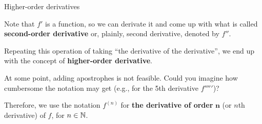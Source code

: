 \documentclass[9pt]{beamer}
\begin{document}
\begin{frame}{Higher-order derivatives}

    Note that $f'$ is a  function, so we can derivate it and come up with what is called \textbf{second-order derivative} or, plainly, second derivative, denoted by $f''$.
    \vspace{0.3cm}

    Repeating this operation of taking ``the derivative of the derivative'', we end up with the concept of \textbf{higher-order derivative}.
    \vspace{0.3cm}

    At some point, adding apostrophes is not feasible. Could you imagine how cumbersome the notation may get (e.g., for the 5th derivative $f'''''$)?
    \vspace{0.3cm}

    Therefore, we use the notation $f^{(n)}$ for \textbf{the derivative of order} $\pmb{n}$ (or $n$th derivative) of $f$, for $n\in\mathbb{N}$.
    
\end{frame}
\end{document}
